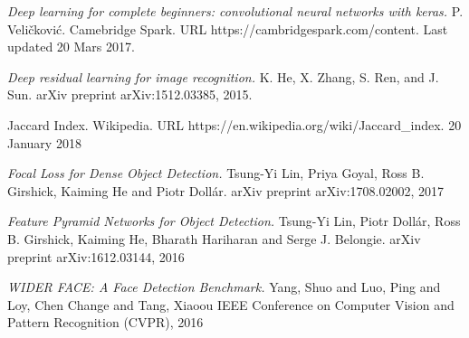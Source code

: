 \documentclass[a4paper,11pt,twoside]{article}
\begin{document}
\begin{thebibliography}{99}
	\textit{Deep learning for complete beginners: convolutional neural networks with keras.}
	P. Veličković.
	Camebridge Spark. 
	URL https://cambridgespark.com/content.
	Last updated 20 Mars 2017.


	\textit{Deep residual learning for image recognition.}
    K. He, X. Zhang, S. Ren, and J. Sun. 
    arXiv preprint arXiv:1512.03385, 2015.

	Jaccard Index. Wikipedia.
    URL https://en.wikipedia.org/wiki/Jaccard{\_}index. 
    20 January 2018
    
	\textit{Focal Loss for Dense Object Detection.}
	Tsung{-}Yi Lin,
    Priya Goyal,
    Ross B. Girshick,
    Kaiming He and
    Piotr Doll{\'{a}}r.
    arXiv preprint arXiv:1708.02002, 2017

	\textit{Feature Pyramid Networks for Object Detection.}
	Tsung{-}Yi Lin,
               Piotr Doll{\'{a}}r,
               Ross B. Girshick,
               Kaiming He,
               Bharath Hariharan and
               Serge J. Belongie.
    arXiv preprint arXiv:1612.03144, 2016
    
	\textit{WIDER FACE: A Face Detection Benchmark.}
	Yang, Shuo and Luo, Ping and Loy, Chen Change and Tang, Xiaoou
    IEEE Conference on Computer Vision and Pattern Recognition (CVPR), 2016

\end{thebibliography}
\end{document}
